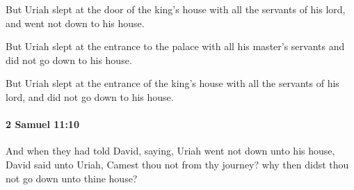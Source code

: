 			\begin{versebox}
					\item[BHS] 
					\item[ASV] But Uriah slept at the door of the king's house with all the servants of his lord, and went not down to his house.
					\item[NIV] But Uriah slept at the entrance to the palace with all his master’s servants and did not go down to his house.
					\item[NRSV] But Uriah slept at the entrance of the king’s house with all the servants of his lord, and did not go down to his house.
			\end{versebox}

		\paragraph{2 Samuel 11:10} %
			\label{2SAMUEL-11-10}

			And when they had told David, saying, Uriah went not down unto his house, David said unto Uriah, Camest thou not from thy journey? why then didst thou not go down unto thine house?

